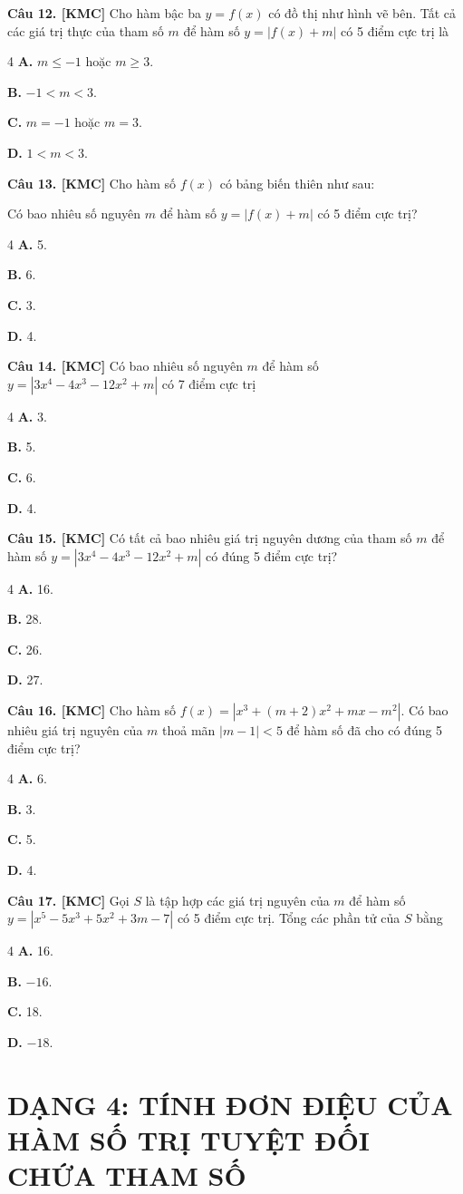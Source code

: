 \documentclass[12pt,a4paper]{article}
\newcommand{\cau}[1]{\noindent\textbf{Câu #1. [KMC]} }
\newcommand{\bonpa}[4]{
    \begin{multicols}{4}
        \noindent\textbf{A.} #1
        \par\noindent\textbf{B.} #2
        \par\noindent\textbf{C.} #3
        \par\noindent\textbf{D.} #4
    \end{multicols}
}
\begin{document}
\cau{12} Cho hàm bậc ba $y = f(x)$ có đồ thị như hình vẽ bên. Tất cả các giá trị thực của tham số $m$ để hàm số $y = |f(x) + m|$ có 5 điểm cực trị là
\begin{center}
\end{center}
\bonpa{$m \le -1$ hoặc $m \ge 3$.}{$-1 < m < 3$.}{$m = -1$ hoặc $m = 3$.}{$1 < m < 3$.}

\cau{13} Cho hàm số $f(x)$ có bảng biến thiên như sau:
\begin{center}
\end{center}
Có bao nhiêu số nguyên $m$ để hàm số $y = |f(x) + m|$ có 5 điểm cực trị?
\bonpa{5.}{6.}{3.}{4.}

\cau{14} Có bao nhiêu số nguyên $m$ để hàm số $y = |3x^4 - 4x^3 - 12x^2 + m|$ có 7 điểm cực trị
\bonpa{3.}{5.}{6.}{4.}

\cau{15} Có tất cả bao nhiêu giá trị nguyên dương của tham số $m$ để hàm số $y = |3x^4 - 4x^3 - 12x^2 + m|$ có đúng 5 điểm cực trị?
\bonpa{16.}{28.}{26.}{27.}

\cau{16} Cho hàm số $f(x) = |x^3 + (m+2)x^2 + mx - m^2|$. Có bao nhiêu giá trị nguyên của $m$ thoả mãn $|m-1| < 5$ để hàm số đã cho có đúng 5 điểm cực trị?
\bonpa{6.}{3.}{5.}{4.}

\cau{17} Gọi $S$ là tập hợp các giá trị nguyên của $m$ để hàm số $y = |x^5 - 5x^3 + 5x^2 + 3m - 7|$ có 5 điểm cực trị. Tổng các phần tử của $S$ bằng
\bonpa{16.}{$-16$.}{18.}{$-18$.}

\section*{DẠNG 4: TÍNH ĐƠN ĐIỆU CỦA HÀM SỐ TRỊ TUYỆT ĐỐI CHỨA THAM SỐ}
\end{document}
